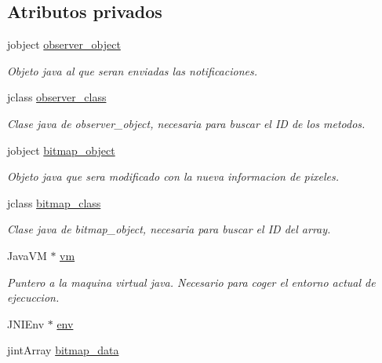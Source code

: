 \subsection*{Atributos privados}
\begin{DoxyCompactItemize}
\item 
jobject \hyperlink{classObservableJNI_a83ba449601906c8683fceabb2d99794e}{observer\-\_\-object}
\begin{DoxyCompactList}\small\item\em Objeto java al que seran enviadas las notificaciones. \end{DoxyCompactList}\item 
jclass \hyperlink{classObservableJNI_ab6114ef78b80e3c0942207c6c7c91283}{observer\-\_\-class}
\begin{DoxyCompactList}\small\item\em Clase java de observer\-\_\-object, necesaria para buscar el I\-D de los metodos. \end{DoxyCompactList}\item 
jobject \hyperlink{classObservableJNI_ab10266460395b3a80d8e64467b54119b}{bitmap\-\_\-object}
\begin{DoxyCompactList}\small\item\em Objeto java que sera modificado con la nueva informacion de pixeles. \end{DoxyCompactList}\item 
jclass \hyperlink{classObservableJNI_a59b4cc88f56425846a2535b72bc3cbd1}{bitmap\-\_\-class}
\begin{DoxyCompactList}\small\item\em Clase java de bitmap\-\_\-object, necesaria para buscar el I\-D del array. \end{DoxyCompactList}\item 
Java\-V\-M $\ast$ \hyperlink{classObservableJNI_addca6d6dd302fd9902108a7f0941556a}{vm}
\begin{DoxyCompactList}\small\item\em Puntero a la maquina virtual java. Necesario para coger el entorno actual de ejecuccion. \end{DoxyCompactList}\item 
J\-N\-I\-Env $\ast$ \hyperlink{classObservableJNI_a8d0b0f613e2cff5fa51cd9fcfc161d3f}{env}
\item 
jint\-Array \hyperlink{classObservableJNI_a7f0ff32e3eca71dae17c435f75a6156a}{bitmap\-\_\-data}
\end{DoxyCompactItemize}


